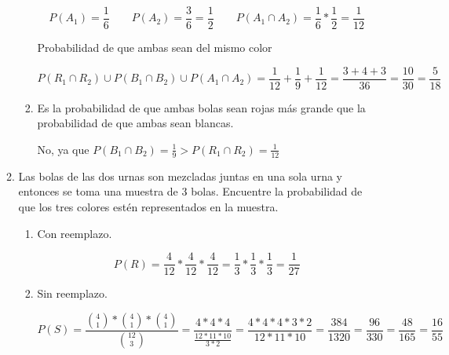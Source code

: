 \documentclass[letterpaper,11pt]{article}
\renewcommand{%
	\contentsname}{\vspace{-1cm} \hfill\bfseries\LARGE Índice \hfill \vspace{0.2cm}%
}
\begin{document}
\begin{enumerate}
\begin{enumerate}
\begin{enumerate}
		$$P(A_1)= \frac{1}{6} \qquad P(A_2) = \frac{3}{6}= \frac{1}{2} \qquad P(A_1 \cap A_2)= \frac{1}{6} * \frac{1}{2} = \frac{1}{12} $$

		Probabilidad de que ambas sean del mismo color 

		$$P(R_1 \cap R_2) \cup P(B_1 \cap B_2) \cup P(A_1 \cap A_2) = \frac{1}{12} + \frac{1}{9} + \frac{1}{12}= \frac{3+4+3}{36} = \frac{10}{30} = \frac{5}{18}$$

		\item Es la probabilidad de que ambas bolas sean rojas más grande que la probabilidad de que ambas sean blancas.
		
		No, ya que $P(B_1 \cap B_2) = \frac{1}{9} > P(R_1 \cap R_2) = \frac{1}{12}$

	\end{enumerate}
	\item Las bolas de las dos urnas son mezcladas juntas en una sola urna y entonces se toma una muestra de 3 bolas. Encuentre la probabilidad de que los tres colores estén representados en la muestra. 
	\begin{enumerate}
		\item Con reemplazo.
		
		$$
		P(R) = \frac{4}{12} * \frac{4}{12} * \frac{4}{12} = \frac{1}{3} * \frac{1}{3} * \frac{1}{3} = \frac{1}{27}
		$$

		\item Sin reemplazo.
		
		$$
		P(S) = \frac{ {4 \choose 1} * {4 \choose 1} * {4 \choose 1} }{ {12 \choose 3} } = \frac{4*4*4}{\frac{12*11*10}{3*2}} = \frac{4*4*4*3*2}{12*11*10} = \frac{384}{1320} = \frac{96}{330} = \frac{48}{165} = \frac{16}{55}
		$$
	\end{enumerate}
\end{enumerate}



\end{enumerate}
\end{document}
